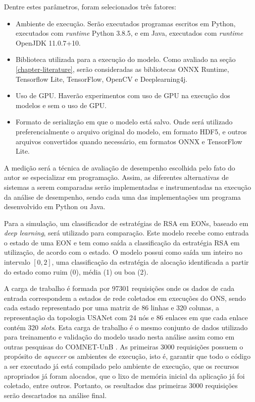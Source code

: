 Dentre estes parâmetros, foram selecionados três fatores:

\begin{itemize}
  \item Ambiente de execução. Serão executados programas escritos em Python, executados com \textit{runtime} Python 3.8.5, e em Java, executados com \textit{runtime} OpenJDK 11.0.7+10.
  \item Biblioteca utilizada para a execução do modelo. Como avaliado na seção \ref{chapter-literature}, serão consideradas as bibliotecas ONNX Runtime, Tensorflow Lite, TensorFlow, OpenCV e Deeplearning4j.
  \item Uso de GPU. Haverão experimentos com uso de GPU na execução dos modelos e sem o uso de GPU.
  \item Formato de serializção em que o modelo está salvo. Onde será utilizado preferencialmente o arquivo original do modelo, em formato HDF5, e outros arquivos convertidos quando necessário, em formatos ONNX e TensorFlow Lite.
\end{itemize}

A medição será a técnica de avaliação de desempenho escolhida pelo fato do autor se especializar em programação. Assim, as diferentes alternativas de sistemas a serem comparadas serão implementadas e instrumentadas na execução da análise de desempenho, sendo cada uma das implementações um programa desenvolvido em Python ou Java.

Para a simulação, um classificador de estratégias de RSA em EONs, baseado em \textit{deep learning}, será utilizado para comparação. Este modelo recebe como entrada o estado de uma EON e tem como saída a classificação da estratégia RSA em utilização, de acordo com o estado. O modelo possui como saída um inteiro no intervalo $[0, 2]$, uma classificação da estratégia de alocação identificada a partir do estado como ruim (0), média (1) ou boa (2).

A carga de trabalho é formada por 97301 requisições onde os dados de cada entrada correspondem a estados de rede coletados em execuções do ONS, sendo cada estado representado por uma matriz de 86 linhas e 320 colunas, a representação da topologia USANet com 24 nós e 86 enlaces em que cada enlace contém 320 \textit{slots}. Esta carga de trabalho é o mesmo conjunto de dados utilizado para treinamento e validação do modelo usado nesta análise assim como em outras pesquisas do \acrfull{COMNET-UnB} \cite{eon_ml_classifier_2020}. As primeiras 3000 requisições possuem o propósito de \textit{aquecer} os ambientes de execução, isto é, garantir que todo o código a ser executado já está compilado pelo ambiente de execução, que os recursos apropriados já foram alocados, que o lixo de memória inicial da aplicação já foi coletado, entre outros. Portanto, os resultados das primeiras 3000 requisições serão descartados na análise final.

